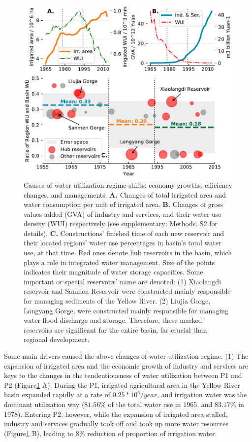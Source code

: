 \documentclass[9pt, twocolumn, twoside, lineno]{pnas-new}
\begin{document}
\begin{figure}%
	\centering
	\includegraphics[width=\linewidth]{../../figures/main_text/causes.pdf}
	\caption{
		Causes of water utilization regime shifts: economy growths, efficiency changes, and managements.
		\textbf{A.} Changes of total irrigated area and water consumption per unit of irrigated area.
		\textbf{B.} Changes of gross values added (GVA) of industry and services, and their water use density (WUI) respectively (see supplementary: Methods. S2 for details).
		\textbf{C.} Constructions' finished time of each new reservoir and their located regions' water use percentages in basin's total water use, at that time. Red ones denote hub reservoirs in the basin, which plays a role in integrated water management. Size of the points indicates their magnitude of water storage capacities. Some important or special reservoirs' name are denoted: (1) Xiaolangdi reservoir and Sanmen Reservoir were constructed mainly responsible for managing sediments of the Yellow River. (2) Liujia Gorge, Longyang Gorge, were constructed mainly responsible for managing water flood discharge and storage. Therefore, these marked reservoirs are significant for the entire basin, far crucial than regional development.
	}
	\label{fig:Causes}
\end{figure}

Some main drivers caused the above changes of water utilization regime.
(1) The expansion of irrigated area and the economic growth of industry and services are keys to the changes in the tendentiousness of water utilization between P1 and P2 (Figure\ref{fig:Causes} A). During the P1, irrigated agricultural area in the Yellow River basin expanded rapidly at a rate of $0.25*10^6/year$, and irrigation water was the dominant utilization way ($81.56\%$ of the total water use in 1965, and $83.17\%$ in 1978). Entering P2, however, while the expansion of irrigated area stalled, industry and services gradually took off and took up more water resources (Figure\ref{fig:Causes} B), leading to $8\%$ reduction of proportion of irrigation water.
\end{document}
